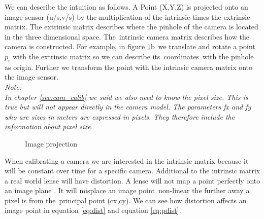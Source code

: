 \documentclass[11pt,a4paper,titlepage,oneside]{report}
\begin{document}
We can describe the intuition as follows. A Point (X,Y,Z) is projected onto an image sensor (u/s,v/s) by the multiplication of the intrinsic times the extrinsic matrix. The extrinsic matrix describes where the pinhole of the camera is located in the three dimensional space. The intrinsic camera matrix describes how the camera is constructed. For example, in figure \ref{fig:projection}b we translate and rotate a point $p_i$ with the extrinsic matrix so we can describe its coordinates with the pinhole as origin. Further we transform the point with the intrinsic camera matrix onto the image sensor.\\
\em
Note:\\
In chapter \ref{sec:cam_calib} we said we also need to know the pixel size. This is true but will not appear directly in the camera model. The parameters fx and fy who are sizes in meters are expressed in pixels. They therefore include the information about pixel size.
\normalfont

\begin{figure}[H]
	\centering
	\caption{Image projection}\label{fig:projection}
\end{figure}

When calibrating a camera we are interested in the intrinsic matrix because it will be constant over time for a specific camera. Additional to the intrinsic matrix a real world lense will have distortion. A lense will not map a point perfectly onto an image plane \cite{rvc}. It will misplace an image point non-linear the further away a pixel is from the principal point (cx,cy). We can see how distortion affects an image point in equation \ref{eq:dist} and equation \ref{eq:pdist}.
\end{document}
